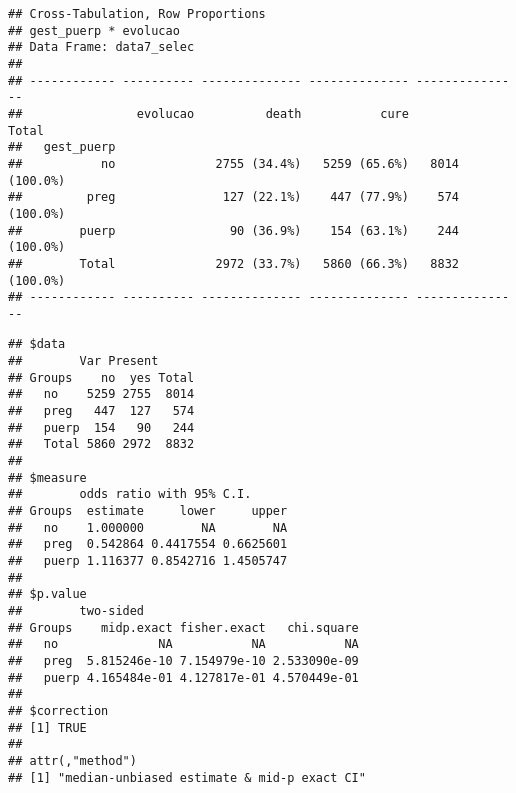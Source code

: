 \documentclass[
]{article}
\newenvironment{Shaded}{\begin{snugshade}}{\end{snugshade}}
\newcommand{\DataTypeTok}[1]{\textcolor[rgb]{0.13,0.29,0.53}{#1}}
\newcommand{\KeywordTok}[1]{\textcolor[rgb]{0.13,0.29,0.53}{\textbf{#1}}}
\newcommand{\NormalTok}[1]{#1}
\newcommand{\OperatorTok}[1]{\textcolor[rgb]{0.81,0.36,0.00}{\textbf{#1}}}
\newcommand{\OtherTok}[1]{\textcolor[rgb]{0.56,0.35,0.01}{#1}}
\newcommand{\StringTok}[1]{\textcolor[rgb]{0.31,0.60,0.02}{#1}}
\begin{document}
\begin{Shaded}
\end{Shaded}

\begin{Shaded}
\end{Shaded}

\begin{verbatim}
## Cross-Tabulation, Row Proportions  
## gest_puerp * evolucao  
## Data Frame: data7_selec  
## 
## ------------ ---------- -------------- -------------- ---------------
##                evolucao          death           cure           Total
##   gest_puerp                                                         
##           no              2755 (34.4%)   5259 (65.6%)   8014 (100.0%)
##         preg               127 (22.1%)    447 (77.9%)    574 (100.0%)
##        puerp                90 (36.9%)    154 (63.1%)    244 (100.0%)
##        Total              2972 (33.7%)   5860 (66.3%)   8832 (100.0%)
## ------------ ---------- -------------- -------------- ---------------
\end{verbatim}

\begin{Shaded}
\end{Shaded}

\begin{verbatim}
## $data
##        Var Present
## Groups    no  yes Total
##   no    5259 2755  8014
##   preg   447  127   574
##   puerp  154   90   244
##   Total 5860 2972  8832
## 
## $measure
##        odds ratio with 95% C.I.
## Groups  estimate     lower     upper
##   no    1.000000        NA        NA
##   preg  0.542864 0.4417554 0.6625601
##   puerp 1.116377 0.8542716 1.4505747
## 
## $p.value
##        two-sided
## Groups    midp.exact fisher.exact   chi.square
##   no              NA           NA           NA
##   preg  5.815246e-10 7.154979e-10 2.533090e-09
##   puerp 4.165484e-01 4.127817e-01 4.570449e-01
## 
## $correction
## [1] TRUE
## 
## attr(,"method")
## [1] "median-unbiased estimate & mid-p exact CI"
\end{verbatim}
\end{document}
